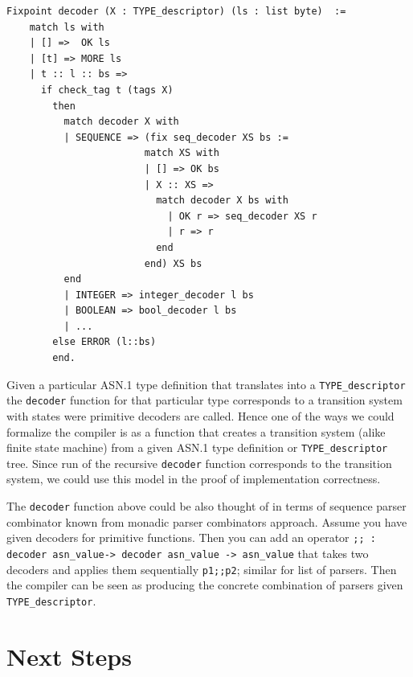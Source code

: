 \documentclass[acmsmall,nonacm]{acmart}
\begin{document}
 \begin{lstlisting}[language=Coq]
 Fixpoint decoder (X : TYPE_descriptor) (ls : list byte)  :=
    match ls with
    | [] =>  OK ls
    | [t] => MORE ls       
    | t :: l :: bs =>          
      if check_tag t (tags X)
        then
          match decoder X with 
          | SEQUENCE => (fix seq_decoder XS bs :=
                        match XS with
                        | [] => OK bs
                        | X :: XS =>
                          match decoder X bs with
                            | OK r => seq_decoder XS r 
                            | r => r
                          end
                        end) XS bs
          end
          | INTEGER => integer_decoder l bs
          | BOOLEAN => bool_decoder l bs
          | ...                                    
        else ERROR (l::bs)
        end.
 \end{lstlisting}

 Given a particular ASN.1 type definition that translates into a
 \texttt{TYPE\_descriptor} the \texttt{decoder} function for that
 particular type corresponds to a transition system with states were
 primitive decoders are called. Hence one of the ways we could
 formalize the compiler is as a function that creates a transition
 system (alike finite state machine) from a given ASN.1 type
 definition or \texttt{TYPE\_descriptor} tree. Since run of the
 recursive \texttt{decoder} function corresponds to the transition
 system, we could use this model in the proof of implementation
 correctness.

 The \texttt{decoder} function above could be also thought of in terms
 of sequence parser combinator known from monadic parser combinators
 approach\cite{TODO}. Assume you have given decoders for primitive
 functions. Then you can add an operator \texttt{;; : decoder
   asn\_value-> decoder asn\_value -> asn\_value} that takes two
 decoders and applies them sequentially \texttt{p1;;p2}; similar for
 list of parsers. Then the compiler can be seen as producing the
 concrete combination of parsers given \texttt{TYPE\_descriptor}.

 \section{Next Steps}
\end{document}
